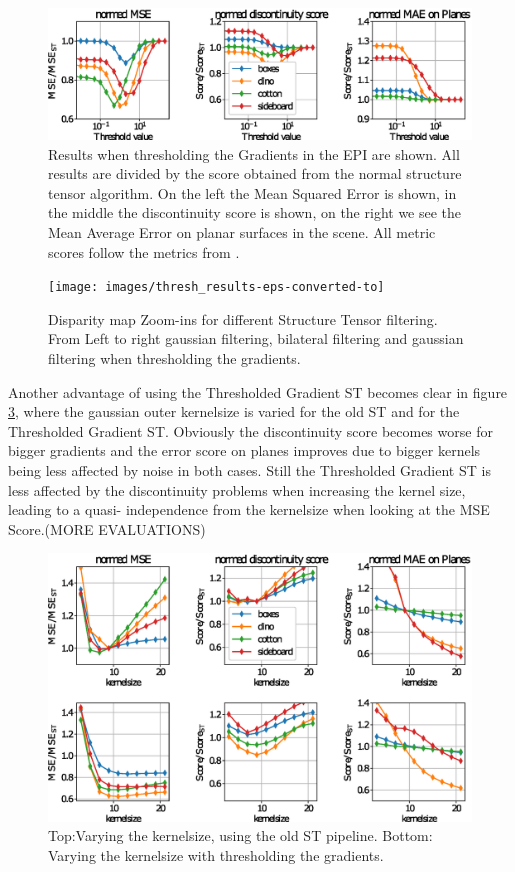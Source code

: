 \documentclass  [
  paper    = a4,
  BCOR     = 10mm,
  twoside,
  fontsize = 12pt,
  fleqn,
  toc      = bibnumbered,
  toc      = listofnumbered,
  numbers  = noendperiod,
  headings = normal,
  listof   = leveldown,
  version  = 3.03
]                                       {scrreprt}
\begin{document}
\begin{figure}
	\centering
	\includegraphics[width=1\linewidth]{images/thresh_params}
	\caption[Results when thresholding the Gradients in the EPI]{Results when thresholding the Gradients in the EPI are shown. All results are divided by the score obtained from the normal structure tensor algorithm. On the left the Mean Squared Error is shown, in the middle the discontinuity score is shown, on the right we see the Mean Average Error on planar surfaces in the scene. All metric scores follow the metrics from \cite{honauer2016benchmark}. }
	\label{fig:threshparams}
\end{figure}
\begin{figure}
	\centering
	\texttt{[image: images/thresh\_results-eps-converted-to]}
	\caption[Disparity map Zoom-ins for different methods]{Disparity map Zoom-ins for different Structure Tensor filtering. From Left to right gaussian filtering, bilateral filtering and gaussian filtering when thresholding the gradients.}
	\label{fig:threshresults}
\end{figure}

Another advantage of using the Thresholded Gradient ST becomes clear in figure \ref{fig:oldouter}, where the gaussian outer kernelsize is varied for the old ST and for the Thresholded Gradient ST. Obviously the discontinuity score becomes worse for bigger gradients and the error score on planes improves due to bigger kernels being less affected by noise in both cases. Still the Thresholded Gradient ST is less affected by the discontinuity problems when increasing the kernel size, leading to a quasi- independence from the kernelsize when looking at the MSE Score.(MORE EVALUATIONS)

\begin{figure}
	\centering
	\includegraphics[width=1\linewidth]{images/old_outer}
	\caption[Varying kernelsize]{Top:Varying the kernelsize, using the old ST pipeline. Bottom: Varying the kernelsize with thresholding the gradients.}
	\label{fig:oldouter}
\end{figure}
\end{document}
